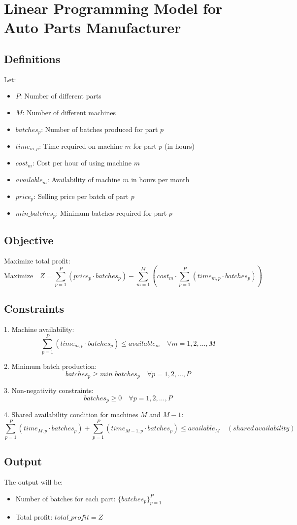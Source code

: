 \documentclass{article}
\begin{document}
\section*{Linear Programming Model for Auto Parts Manufacturer}

\subsection*{Definitions}
Let:
\begin{itemize}
    \item \( P \): Number of different parts
    \item \( M \): Number of different machines
    \item \( batches_{p} \): Number of batches produced for part \( p \)
    \item \( time_{m,p} \): Time required on machine \( m \) for part \( p \) (in hours)
    \item \( cost_{m} \): Cost per hour of using machine \( m \)
    \item \( available_{m} \): Availability of machine \( m \) in hours per month
    \item \( price_{p} \): Selling price per batch of part \( p \)
    \item \( min\_batches_{p} \): Minimum batches required for part \( p \)
\end{itemize}

\subsection*{Objective}
Maximize total profit:
\[
\text{Maximize} \quad Z = \sum_{p=1}^{P} (price_{p} \cdot batches_{p}) - \sum_{m=1}^{M} \left( cost_{m} \cdot \sum_{p=1}^{P} (time_{m,p} \cdot batches_{p}) \right)
\]

\subsection*{Constraints}
1. Machine availability:
\[
\sum_{p=1}^{P} (time_{m,p} \cdot batches_{p}) \leq available_{m} \quad \forall m = 1, 2, \ldots, M
\]

2. Minimum batch production:
\[
batches_{p} \geq min\_batches_{p} \quad \forall p = 1, 2, \ldots, P
\]

3. Non-negativity constraints:
\[
batches_{p} \geq 0 \quad \forall p = 1, 2, \ldots, P
\]

4. Shared availability condition for machines \( M \) and \( M-1 \):
\[
\sum_{p=1}^{P} (time_{M,p} \cdot batches_{p}) + \sum_{p=1}^{P} (time_{M-1,p} \cdot batches_{p}) \leq available_{M} \quad (shared \, availability)
\]

\subsection*{Output}
The output will be:
\begin{itemize}
    \item Number of batches for each part: \( \{ batches_{p} \}_{p=1}^{P} \)
    \item Total profit: \( total\_profit = Z \)
\end{itemize}
\end{document}
